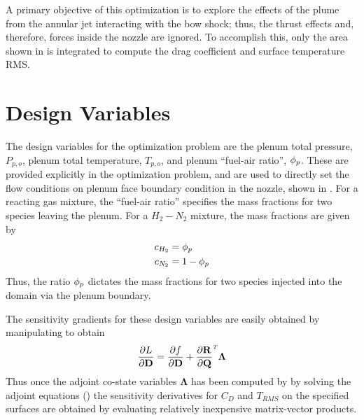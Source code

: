 A primary objective of this optimization is to explore the effects of the plume
from the annular jet interacting with the bow shock; thus, the thrust effects
and, therefore, forces inside the nozzle are ignored.  To accomplish this, only
the area shown in  is integrated to compute the drag
coefficient and surface temperature RMS.


\section{Design Variables}

The design variables for the optimization problem are the plenum total pressure,
$P_{p,o}$, plenum total temperature, $T_{p,o}$, and plenum ``fuel-air ratio'',
$\phi_p$.  These are provided explicitly in the optimization problem, and are used
to directly set the flow conditions on plenum face boundary condition in the
nozzle, shown in .  For a reacting gas mixture, the
``fuel-air ratio'' specifies the mass fractions for two species leaving the
plenum.  For a $H_2-N_2$ mixture, the mass fractions are given by
\begin{equation}
  \begin{aligned}
    c_{H_2} &= \phi_p \\
    c_{N_2} &= 1 - \phi_p
  \end{aligned}
  \label{fuel-air-def}
\end{equation}
Thus, the ratio $\phi_p$ dictates the mass fractions for two species injected into
the domain via the plenum boundary.

The sensitivity gradients for these design variables are easily obtained by
manipulating  to obtain
\begin{equation}
  \pd{L}{\md} = \pd{f}{\md} + \rtdiff{}{\mq} \mathbf{\Lambda}
  \label{obj-linearization}
\end{equation}
Thus once the adjoint co-state variables $\mathbf{\Lambda}$ has been computed by
by solving the adjoint equations () the sensitivity
derivatives for $C_D$ and $T_{RMS}$ on the specified surfaces are obtained by
evaluating relatively inexpensive matrix-vector products.

